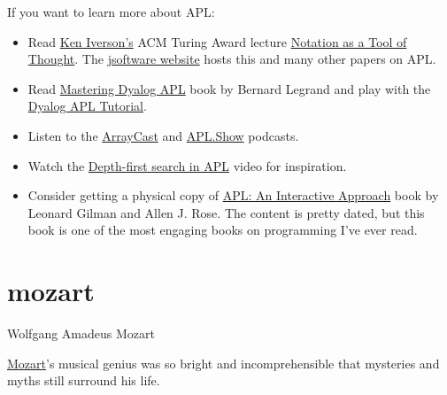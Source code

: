 \documentclass{article}
\begin{document}
If you want to learn more about APL:
\begin{itemize}
  \item
    Read \href{https://en.wikipedia.org/wiki/Kenneth_E._Iverson}{Ken Iverson's} ACM Turing Award lecture \href{https://dl.acm.org/doi/10.1145/358896.358899}{Notation as a Tool of Thought}.
    The \href{https://www.jsoftware.com/papers/}{jsoftware website} hosts this and many other papers on APL.
  \item
    Read \href{http://www.dyalog.com/mastering-dyalog-apl.htm}{Mastering Dyalog APL} book by Bernard Legrand and play with the \href{https://tutorial.dyalog.com/}{Dyalog APL Tutorial}.
  \item
    Listen to the \href{https://arraycast.com/}{ArrayCast} and \href{https://apl.show/}{APL.Show} podcasts.
  \item
    Watch the \href{https://youtu.be/DsZdfnlh_d0}{Depth-first search in APL} video for inspiration.
  \item
    Consider getting a physical copy of \href{https://www.amazon.com/APL-Interactive-Approach-Leonard-Gilman/dp/0471093041}{APL: An Interactive Approach} book by Leonard Gilman and Allen J. Rose.
    The content is pretty dated, but this book is one of the most engaging books on programming I've ever read.
\end{itemize}

\section{mozart}{Wolfgang Amadeus Mozart}

\href{https://en.wikipedia.org/wiki/Wolfgang_Amadeus_Mozart}{Mozart}'s musical genius was so bright and incomprehensible that mysteries and myths still surround his life.
\end{document}
